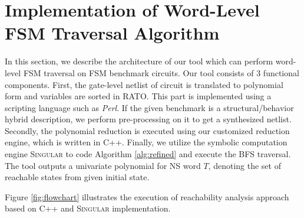 \section{Implementation of Word-Level FSM Traversal Algorithm}
In this section, we describe the architecture of our tool which can perform word-level FSM traversal
on FSM benchmark circuits. Our tool consists of 3 functional components.
First, the gate-level netlist of circuit is translated to polynomial form and variables are sorted in 
RATO. This part is implemented using a scripting language such as \emph{Perl}. If 
the given benchmark is a structural/behavior hybrid description, we perform pre-processing on it to get a synthesized netlist.
Secondly, the polynomial reduction is executed using our customized reduction engine, which is written in C++.
Finally, we utilize the symbolic computation engine \textsc{Singular} \cite{DGPS} to code Algorithm 
\ref{alg:refined} and execute the BFS traversal. The tool outputs a univariate polynomial 
for NS word $T$, denoting the set of reachable states from given initial state.

Figure \ref{fig:flowchart} illustrates the execution of reachability analysis approach
based on C++ and \textsc{Singular} implementation.

\begin{figure}[H]
\end{figure}

